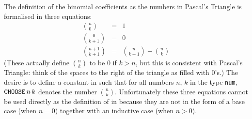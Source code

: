 The definition of the binomial coefficients as the numbers in Pascal's Triangle
is formalised in three equations:
\begin{eqnarray*}
n \choose 0 &=& 1 \\
0 \choose {k+1} &=& 0 \\
{n+1} \choose {k+1} &=& {{n} \choose {k+1}} + {{n} \choose {k}}
\end{eqnarray*}
(These actually define $n \choose k$ to be $0$ if $k>n$, but this is 
consistent with Pascal's Triangle: think of the spaces to the right of 
the triangle as filled with $0$'s.) The desire is to define a constant 
\verb@CHOOSE@ in \HOL{} such that for all numbers $n$, $k$ in the type 
{\tt num}, $\verb@CHOOSE@\,n\,k$ denotes the number $n \choose k$.  
Unfortunately these three equations cannot be used directly as the definition 
of \verb@CHOOSE@ in \HOL{} because they are not in the form of a base case 
(when $n=0$) together with an inductive case (when $n>0$).

